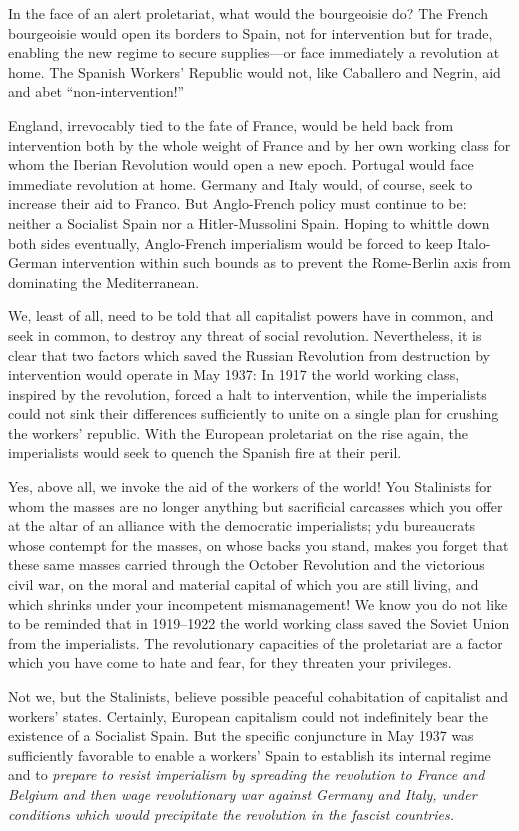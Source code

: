 In the face of an alert proletariat, what would the bourgeoisie do? The French bourgeoisie would open its borders to Spain, not for intervention but for trade, enabling the new regime to secure supplies---or face immediately a revolution at home. The Spanish Workers’ Republic would not, like Caballero and Negrin, aid and abet ``non-intervention!''

England, irrevocably tied to the fate of France, would be held back from intervention both by the whole weight of France and by her own working class for whom the Iberian Revolution would open a new epoch. Portugal would face immediate revolution at home. Germany and Italy would, of course, seek to increase their aid to Franco. But Anglo-French policy must continue to be: neither a Socialist Spain nor a Hitler-Mussolini Spain. Hoping to whittle down both sides eventually, Anglo-French imperialism would be forced to keep Italo-German intervention within such bounds as to prevent the Rome-Berlin axis from dominating the Mediterranean.

We, least of all, need to be told that all capitalist powers have in common, and seek in common, to destroy any threat of social revolution. Nevertheless, it is clear that two factors which saved the Russian Revolution from destruction by intervention would operate in May 1937: In 1917 the world working class, inspired by the revolution, forced a halt to intervention, while the imperialists could not sink their differences sufficiently to unite on a single plan for crushing the workers’ republic. With the European proletariat on the rise again, the imperialists would seek to quench the Spanish fire at their peril.

Yes, above all, we invoke the aid of the workers of the world! You Stalinists for whom the masses are no longer anything but sacrificial carcasses which you offer at the altar of an alliance with the democratic imperialists; ydu bureaucrats whose contempt for the masses, on whose backs you stand, makes you forget that these same masses carried through the October Revolution and the victorious civil war, on the moral and material capital of which you are still living, and which shrinks under your incompetent mismanagement! We know you do not like to be reminded that in 1919–1922 the world working class saved the Soviet Union from the imperialists. The revolutionary capacities of the proletariat are a factor which you have come to hate and fear, for they threaten your privileges.

Not we, but the Stalinists, believe possible peaceful cohabitation of capitalist and workers’ states. Certainly, European capitalism could not indefinitely bear the existence of a Socialist Spain. But the specific conjuncture in May 1937 was sufficiently favorable to enable a workers’ Spain to establish its internal regime and to \emph{prepare to resist imperialism by spreading the revolution to France and Belgium and then wage revolutionary war against Germany and Italy, under conditions which would precipitate the revolution in the fascist countries.}

